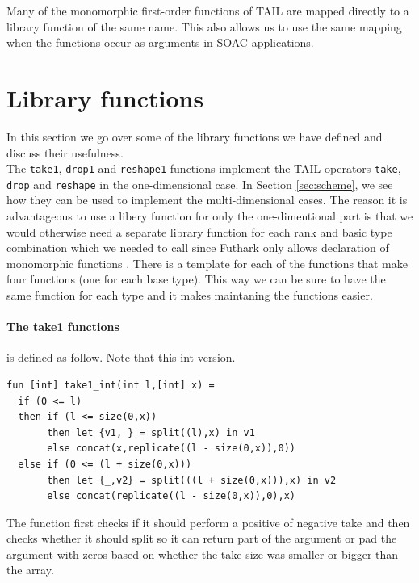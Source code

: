 \documentclass[11pt]{article}
\begin{document}
Many of the monomorphic first-order functions of TAIL are mapped directly to a library function of the same name. This also allows us to use the same mapping when the functions occur as arguments in SOAC applications.\\


\section{Library functions}
In this section we go over some of the library functions we have defined and discuss their usefulness.\\

The {\tt take1}, {\tt drop1} and {\tt reshape1} functions implement the TAIL operators {\tt take}, {\tt drop} and {\tt reshape} in the one-dimensional case. In Section \ref{sec:scheme}, we see how they can be used to implement the multi-dimensional cases. The reason it is advantageous to use a libery function for only the one-dimentional part is that we would otherwise need a separate library function for each 
rank and basic type combination which we needed to call since Futhark only allows declaration of monomorphic functions \cite{TroelsHenriksen}.
There is a template for each of the functions that make four functions (one for each base type). This way we can be sure to have the same function for each type and it makes maintaning the functions easier. 

\paragraph{The take1 functions} is defined as follow. Note that this int version.
\begin{lstlisting}[language=Futhark]
fun [int] take1_int(int l,[int] x) =
  if (0 <= l)
  then if (l <= size(0,x))
       then let {v1,_} = split((l),x) in v1
       else concat(x,replicate((l - size(0,x)),0))
  else if (0 <= (l + size(0,x)))
       then let {_,v2} = split(((l + size(0,x))),x) in v2
       else concat(replicate((l - size(0,x)),0),x)
\end{lstlisting}

The function first checks if it should perform a positive of negative take and then checks whether it should split so it can return
part of the argument or pad the argument with zeros based on whether the take size was smaller or bigger than the array.
\end{document}

